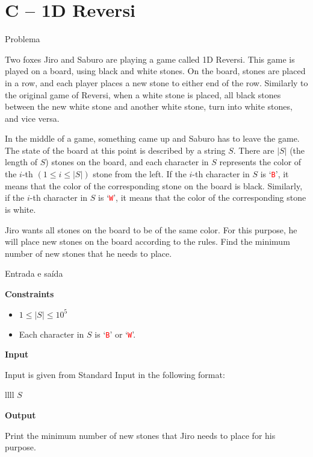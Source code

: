 \section{C -- 1D Reversi}

\begin{frame}[fragile]{Problema}

Two foxes Jiro and Saburo are playing a game called 1D Reversi. This game is played on a board, 
using black and white stones. On the board, stones are placed in a row, and each player places 
a new stone to either end of the row. Similarly to the original game of Reversi, when a white 
stone is placed, all black stones between the new white stone and another white stone, turn 
into white stones, and vice versa.

In the middle of a game, something came up and Saburo has to leave the game. The state of the 
board at this point is described by a string $S$. There are $|S|$ (the length of $S$) stones on 
the board, and each character in $S$ represents the color of the $i$-th $(1\leq i\leq |S|)$
stone from the left. If the $i$-th character in $S$ is `\texttt{\textcolor{red}{B}}', it means
that the color of the corresponding stone on the board is black. Similarly, if the $i$-th 
character in $S$ is `\texttt{\textcolor{red}{W}}', it means that the color of the corresponding 
stone is white.

Jiro wants all stones on the board to be of the same color. For this purpose, he will place new 
stones on the board according to the rules. Find the minimum number of new stones that he needs 
to place.

\end{frame}

\begin{frame}[fragile]{Entrada e saída}

\textbf{Constraints}

\begin{itemize}
    \item $1\leq |S|\leq 10^5$
    \item Each character in $S$ is `\texttt{\textcolor{red}{B}}' or `\texttt{\textcolor{red}{W}}'.
\end{itemize}

\textbf{Input}

Input is given from Standard Input in the following format:
\begin{atcoderio}{llll}
$S$ \\
\end{atcoderio}

\vspace{0.1in}

\textbf{Output}

Print the minimum number of new stones that Jiro needs to place for his purpose.

\end{frame}

